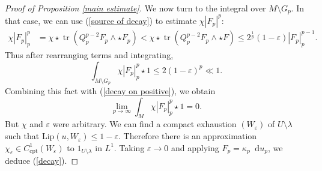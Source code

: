 \documentclass[reqno,11pt]{amsart}
\newcommand*\dif{\mathop{}\!\mathrm{d}}
\DeclareMathOperator{\tr}{tr}
\newcommand{\Lip}{\mathrm{Lip}}
\newcommand{\cpt}{\mathrm{cpt}}
\theoremstyle{definition}
\numberwithin{equation}{section}
\begin{document}
\begin{proof}[Proof of Proposition \ref{main estimate}]
We now turn to the integral over $M \setminus G_p$.
In that case, we can use (\ref{source of decay}) to estimate $\chi |F_p|^p$:
\begin{align*}
\chi |F_p|_p^p &= \chi \star \tr(Q_p^{p - 2} F_p \wedge \star F_p) < \chi \star \tr(Q_p^{p - 2} F_p \wedge \star F) \leq 2^{\frac{1}{p}} (1 - \varepsilon) |F_p|_p^{p - 1}.
\end{align*}
Thus after rearranging terms and integrating,
$$\int_{M \setminus G_p} \chi |F_p|_p^p \star 1 \leq 2(1 - \varepsilon)^p \ll 1.$$
Combining this fact with (\ref{decay on positive}), we obtain 
$$\lim_{p \to \infty} \int_M \chi |F_p|_p^p \star 1 = 0.$$
But $\chi$ and $\varepsilon$ were arbitrary.
We can find a compact exhaustion $(W_\varepsilon)$ of $U \setminus \lambda$ such that $\Lip(u, W_\varepsilon) \leq 1 - \varepsilon$.
Therefore there is an approximation $\chi_\varepsilon \in C^1_\cpt(W_\varepsilon)$ to $1_{U \setminus \lambda}$ in $L^1$.
Taking $\varepsilon \to 0$ and applying $F_p = \kappa_p \dif u_p$, we deduce (\ref{decay}).
\end{proof}

\end{document}
